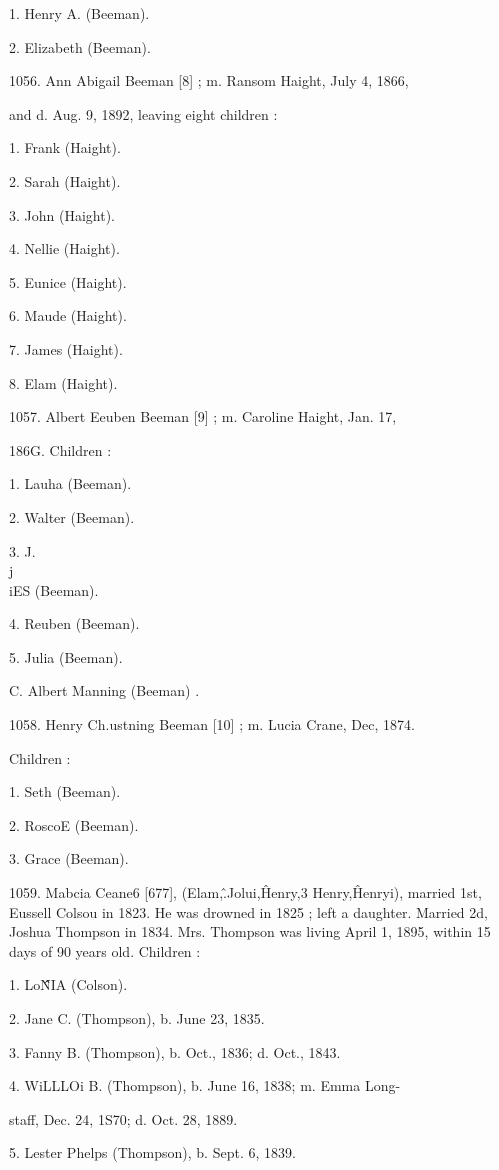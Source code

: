 \documentclass{book}
\begin{document}
1. Henry A. (Beeman). 

2. Elizabeth (Beeman). 

1056. Ann Abigail Beeman [8] ; m. Ransom Haight, July 4, 1866, 

and d. Aug. 9, 1892, leaving eight children : 

1. Frank (Haight). 

2. Sarah (Haight). 

3. John (Haight). 

4. Nellie (Haight). 

5. Eunice (Haight). 

6. Maude (Haight). 

7. James (Haight). 

8. Elam (Haight). 




1057. Albert Eeuben Beeman [9] ; m. Caroline Haight, Jan. 17, 

186G. Children : 

1. Lauha (Beeman). 

2. Walter (Beeman). 

3. J.\\j\\iES (Beeman). 

4. Reuben (Beeman). 

5. Julia (Beeman). 

C. Albert Manning (Beeman) . 

1058. Henry Ch.ustning Beeman [10] ; m. Lucia Crane, Dec, 1874. 

Children : 

1. Seth (Beeman). 

2. RoscoE (Beeman). 

3. Grace (Beeman). 

1059. Mabcia Ceane6 [677], (Elam,\^ .Jolui,\^ Henry,3 Henry,\^ 
Henryi), married 1st, Eussell Colsou in 1823. He was drowned 
in 1825 ; left a daughter. Married 2d, Joshua Thompson in 
1834. Mrs. Thompson was living April 1, 1895, within 15 days 
of 90 years old. Children : 

1. Lo\^\^NIA (Colson). 

2. Jane C. (Thompson), b. June 23, 1835. 

3. Fanny B. (Thompson), b. Oct., 1836; d. Oct., 1843. 

4. WiLLLOi B. (Thompson), b. June 16, 1838; m. Emma Long- 

staff, Dec. 24, 1S70; d. Oct. 28, 1889. 

5. Lester Phelps (Thompson), b. Sept. 6, 1839. 
\end{document}
